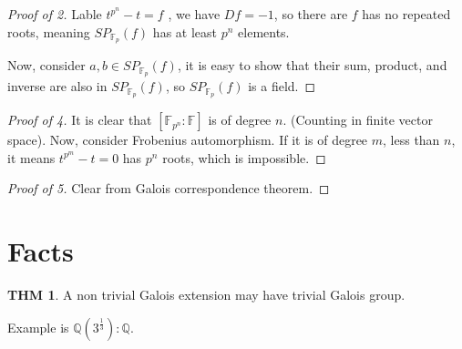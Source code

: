 \documentclass[twocolumn]{article}
\newcommand{\F}{\mathbb{F}}
\newcommand{\Q}{\mathbb{Q}}
\theoremstyle{definition}
\newtheorem{thm}{THM}
\theoremstyle{remark}
\begin{document}
\begin{proof}[Proof of 2]
	Lable $t^{p^n} - t = f$	, we have $Df = -1$, so there are $f$ has no repeated roots, meaning $SP_{\F_p}(f)$ has at least $p^n$ elements.

	Now, consider $a,b \in SP_{\F_p}(f)$, it is easy to show that their sum, product, and inverse are also in $SP_{\F_p}(f)$, so $SP_{\F_p}(f)$ is a field.
\end{proof}

\begin{proof}[Proof of 4]
	It is clear that $[\F_{p^n}:\F]$ is of degree $n$. (Counting in finite vector space). 
	Now, consider Frobenius automorphism.
	If it is of degree $m$, less than $n$, it means $t^{p^m} - t = 0$ has $p^n$ roots, which is impossible.
\end{proof}

\begin{proof} [Proof of 5]
	Clear from Galois correspondence theorem.
\end{proof}

\section{Facts}

\begin{thm}
	A non trivial Galois extension may have trivial Galois group.

	Example is $\Q(3^{\frac{1}{3}}):\Q$.
\end{thm}
\end{document}

